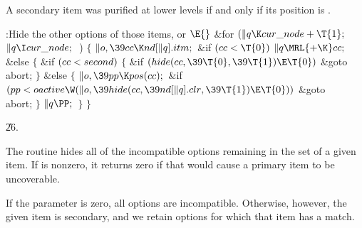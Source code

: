 A secondary item was purified at lower levels if and only if
its position is .

\Y\B\4:Hide the other options of those items, or %
\X${}\E{}$\6
\&{for} ${}(\|q\K\\{cur\_node}+\T{1};{}$ ${}\|q\I\\{cur\_node};{}$ \,)\5
${}\{{}$\1\6
${}\|o,\39\\{cc}\K\\{nd}[\|q].\\{itm};{}$\6
\&{if} ${}(\\{cc}<\T{0}){}$\1\5
${}\|q\MRL{+{\K}}\\{cc};{}$\2\6
\&{else}\5
${}\{{}$\1\6
\&{if} ${}(\\{cc}<\\{second}){}$\5
${}\{{}$\1\6
\&{if} ${}(\\{hide}(\\{cc},\39\T{0},\39\T{1})\E\T{0}){}$\1\5
\&{goto} \\{abort};\2\6
\4${}\}{}$\5
\2\&{else}\5
${}\{{}$\1\6
${}\|o,\39\\{pp}\K\\{pos}(\\{cc});{}$\6
\&{if} ${}(\\{pp}<\\{oactive}\W(\|o,\39\\{hide}(\\{cc},\39\\{nd}[\|q].\\{clr},%
\39\T{1})\E\T{0})){}$\1\5
\&{goto} \\{abort};\2\6
\4${}\}{}$\2\6
${}\|q\PP;{}$\6
\4${}\}{}$\2\6
\4${}\}{}$\2\par
\U26.\fi

The  routine hides all of the incompatible options remaining
in the
set of a given item. If  is nonzero, it
returns zero if that would cause a primary item to be uncoverable.

If the  parameter is zero, all options are incompatible.
Otherwise, however, the given item is secondary, and we retain options
for which that item has a  match.

